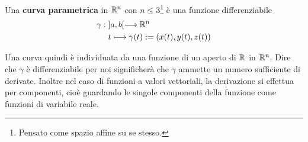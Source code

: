 \begin{figure}[h!]
\begin{center}
{\small
\begin{inaccessibleblock}[TODO.]
{}
\end{inaccessibleblock}
}
\end{center}
\end{figure}
\begin{definizione}
  Una \textbf{curva parametrica} in $\mathbb{R}^{n}$ con $n\le 3$\footnote{Pensato come 
spazio affine su se stesso.} 
  è una funzione differenziabile 
  \[\begin{aligned}
    \gamma: & \; ]a,b[ \longrightarrow \mathbb{R}^{n}\\
    &\;  t\longmapsto \gamma(t):=(x(t),y(t),z(t))
  \end{aligned}\]
\end{definizione}
Una curva quindi è individuata da una funzione di un aperto di $\mathbb{R}^{}$ in 
$\mathbb{R}^{n}$.
Dire che $\gamma$ è differenziabile per noi significherà che $\gamma$ 
ammette 
un numero sufficiente di derivate. Inoltre nel caso di funzioni a valori 
vettoriali, 
la derivazione si effettua per componenti, cioè guardando le singole 
componenti 
della funzione come funzioni di variabile reale.
